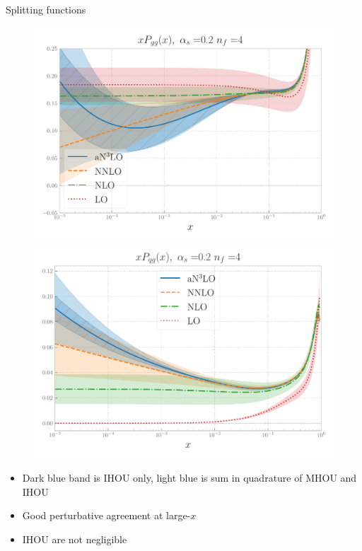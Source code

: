 \documentclass[8pt,t]{beamer}
\begin{document}
\begin{frame}{Splitting functions}
  \begin{figure}
    \centering
    \includegraphics[width=.4\textwidth]{figures/gamma_gg_totu_logx.pdf}
    \includegraphics[width=.4\textwidth]{figures/gamma_qg_totu_logx.pdf}
  \end{figure}
  \begin{itemize}
    \item Dark blue band is IHOU only, light blue is sum in quadrature of MHOU and IHOU
    \item Good perturbative agreement at large-$x$
    \item IHOU are not negligible
  \end{itemize}
\end{frame}
\end{document}

